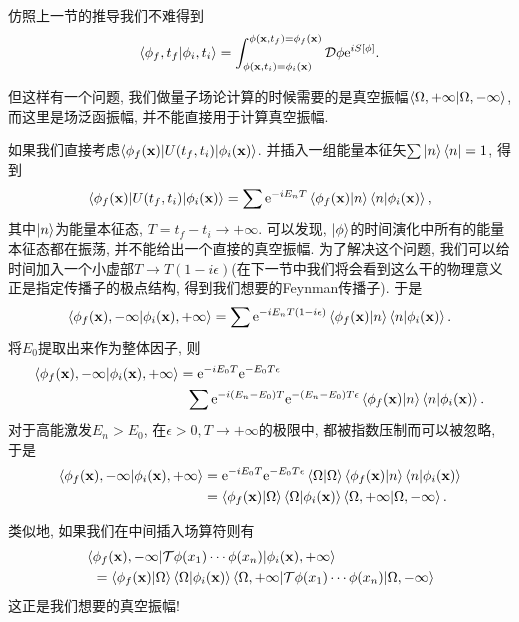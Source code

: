 仿照上一节的推导我们不难得到
\begin{equation}
    \braket{\phi_f, t_f|\phi_i, t_i}=\int_{\phi(\mathbf{x}, t_i)=\phi_i(\mathbf{x})}^{\phi(\mathbf{x}, t_f)=\phi_f(\mathbf{x})}\mathcal D\phi\mathrm e^{iS[\phi]}.
\end{equation}

但这样有一个问题, 我们做量子场论计算的时候需要的是真空振幅$\braket{\Omega, +\infty|\Omega, -\infty}$, 而这里是场泛函振幅, 并不能直接用于计算真空振幅. 

如果我们直接考虑$\braket{\phi_f(\mathbf{x})|U(t_f, t_i)|\phi_i(\mathbf{x})}$. 并插入一组能量本征矢$\sum\ket n\bra n=1$, 得到
\begin{align}
    \braket{\phi_f(\mathbf{x})|U(t_f, t_i)|\phi_i(\mathbf{x})}=\sum \mathrm e^{-iE_nT}\braket{\phi_f(\mathbf{x})|n}\braket{n|\phi_i(\mathbf{x})},
\end{align}
其中$\ket n$为能量本征态, $T=t_f-t_i\to+\infty$. 可以发现, $\ket\phi$的时间演化中所有的能量本征态都在振荡, 并不能给出一个直接的真空振幅. 为了解决这个问题, 我们可以给时间加入一个小虚部$T\to T(1-i\epsilon)$(在下一节中我们将会看到这么干的物理意义正是指定传播子的极点结构, 得到我们想要的Feynman传播子). 于是
\begin{align}
    \braket{\phi_f(\mathbf{x}), -\infty|\phi_i(\mathbf{x}), +\infty}=\sum \mathrm e^{-iE_nT(1-i\epsilon)}\braket{\phi_f(\mathbf{x})|n}\braket{n|\phi_i(\mathbf{x})}.
\end{align}
将$E_0$提取出来作为整体因子, 则
\begin{align}
    \braket{\phi_f(\mathbf{x}), -\infty|\phi_i(\mathbf{x}), +\infty}&=\mathrm e^{-iE_0T}\mathrm e^{-E_0T\epsilon}\notag\\
    &\;\;\sum \mathrm e^{-i(E_n-E_0)T}\mathrm e^{-(E_n-E_0)T\epsilon}\braket{\phi_f(\mathbf{x})|n}\braket{n|\phi_i(\mathbf{x})}.
\end{align}
对于高能激发$E_n>E_0$, 在$\epsilon>0, T\to+\infty$的极限中, 都被指数压制而可以被忽略, 于是
\begin{align}
    \braket{\phi_f(\mathbf{x}), -\infty|\phi_i(\mathbf{x}), +\infty}&=\mathrm e^{-iE_0T}\mathrm e^{-E_0T\epsilon}\braket{\Omega|\Omega}\braket{\phi_f(\mathbf{x})|n}\braket{n|\phi_i(\mathbf{x})}\notag\\
    &=\braket{\phi_f(\mathbf{x})|\Omega}\braket{\Omega|\phi_i(\mathbf{x})}\braket{\Omega, +\infty|\Omega, -\infty}.
\end{align}

类似地, 如果我们在中间插入场算符则有
\begin{align}
    &\braket{\phi_f(\mathbf{x}), -\infty|\mathcal T\phi(x_1)\cdots\phi(x_n)|\phi_i(\mathbf{x}), +\infty}\notag\\
    &\;\;=\braket{\phi_f(\mathbf{x})|\Omega}\braket{\Omega|\phi_i(\mathbf{x})}\braket{\Omega, +\infty|\mathcal T\phi(x_1)\cdots\phi(x_n)|\Omega, -\infty}
\end{align}
这正是我们想要的真空振幅!

